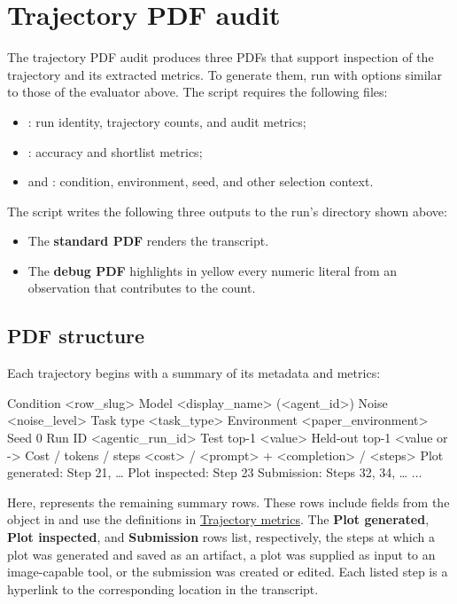 \documentclass[11pt]{article}
\begin{document}
\section*{Trajectory PDF audit}
\label{docstart:trajectory_pdf_visualiser}
The trajectory PDF audit produces three PDFs that support inspection of the trajectory and its extracted metrics.
To generate them, run  with options similar to those of the evaluator above.
The script requires the following files:
\begin{itemize}
    \item {}: run identity, trajectory counts, and audit metrics;
    \item {}: accuracy and shortlist metrics;
    \item {} and : condition, environment, seed, and other selection context.
\end{itemize}
The script writes the following three outputs to the run's  directory shown above:
\begin{itemize}
  \item The \textbf{standard PDF} renders the transcript.
  \item The \textbf{debug PDF} highlights in yellow every numeric literal from an observation that contributes to the count.
\end{itemize}

\subsection*{PDF structure}
Each trajectory begins with a summary of its metadata and metrics:
\begin{DocCode}
Condition <row_slug>
Model <display_name> (<agent_id>)
Noise <noise_level>
Task type <task_type>
Environment <paper_environment>
Seed 0
Run ID <agentic_run_id>
Test top-1 <value>
Held-out top-1 <value or ->
Cost / tokens / steps <cost> / <prompt> + <completion> / <steps>
Plot generated: Step 21, \dots
Plot inspected: Step 23
Submission: Steps 32, 34, \dots
...
\end{DocCode}
Here,  represents the remaining summary rows.
These rows include fields from the  object in  and use the definitions in \hyperref[sec:trajectory-metrics]{Trajectory metrics}.
The \textbf{Plot generated}, \textbf{Plot inspected}, and \textbf{Submission} rows list, respectively, the steps at which a plot was generated and saved as an artifact, a plot was supplied as input to an image-capable tool, or the submission was created or edited.
Each listed step is a hyperlink to the corresponding location in the transcript.
\end{document}
